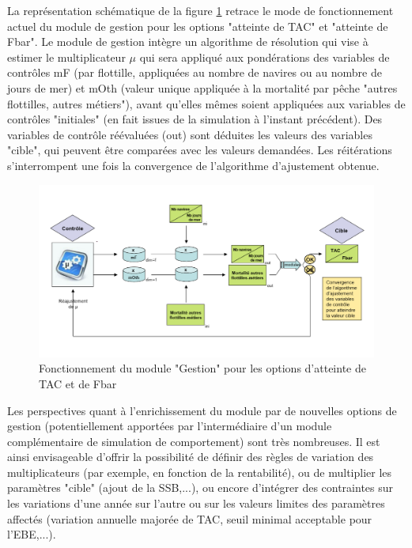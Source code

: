 \documentclass[12pt, colorinlistoftodos, notitlepage]{report}
\newenvironment{not used}[1]{%
    \longtable{%
        |>{\centering$\displaystyle}A{#1}{1}<{$}%
        |}\hline\ignorespaces}{%
    \endlongtable\ignorespacesafterend}
\begin{document}
La représentation schématique de la figure \ref{fig:gest_mod} retrace le mode de fonctionnement actuel du module de gestion pour les options "atteinte de TAC" et "atteinte de Fbar". Le module de gestion intègre un algorithme de résolution qui vise à estimer le multiplicateur $\mu$ qui sera appliqué aux pondérations des variables de contrôles mF (par flottille, appliquées au nombre de navires ou au nombre de jours de mer) et mOth  (valeur unique appliquée à la mortalité par pêche "autres flottilles, autres métiers"), avant qu'elles mêmes soient appliquées aux variables de contrôles "initiales" (en fait issues de la simulation à l'instant précédent). Des variables de contrôle réévaluées (out) sont déduites les valeurs des variables "cible", qui peuvent être comparées avec les valeurs demandées. Les réitérations s'interrompent une fois la convergence de l'algorithme d'ajustement obtenue.


\begin{figure}
\begin{center}
\includegraphics[width = 17cm]{figures/Gestion_module.png}
\end{center}
\caption{Fonctionnement du module "Gestion" pour les options d'atteinte de TAC et de Fbar}
\label{fig:gest_mod}
\end{figure}

Les perspectives quant à l'enrichissement du module par de nouvelles options de gestion (potentiellement apportées par l'intermédiaire d'un module complémentaire de simulation de comportement) sont très nombreuses. Il est ainsi envisageable d'offrir la possibilité de définir des règles de variation des multiplicateurs (par exemple, en fonction de la rentabilité), ou de multiplier les paramètres "cible" (ajout de la SSB,...), ou encore d'intégrer des contraintes sur les variations d'une année sur l'autre ou sur les valeurs limites des paramètres affectés (variation annuelle majorée de TAC, seuil minimal acceptable pour l'EBE,...).
\end{document}
